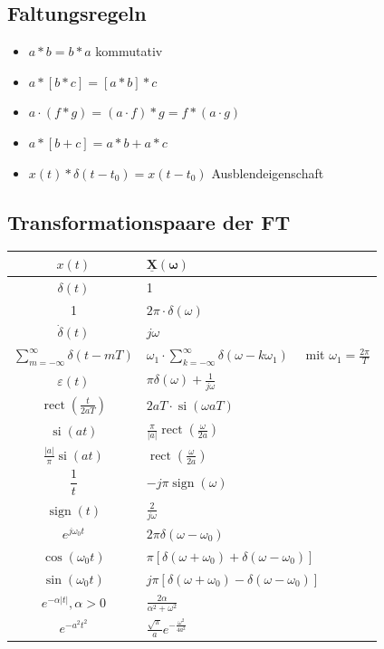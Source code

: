 \subsection{Faltungsregeln}
\normalsize
\begin{itemize}
	\item {$a*b=b*a$} {\small \qquad kommutativ}
	\item $a*[b*c]=[a*b]*c$
	\item $a\cdot(f*g)=(a\cdot f) * g = f * (a\cdot g)$
	\item $a*[b+c]=a*b+a*c$
	\item $x(t) * \delta(t-t_0) = x(t-t_0)$ {\small \qquad Ausblendeigenschaft}
\end{itemize}

\subsection{Transformationspaare der FT}
\begin{tabularx}{0.95\columnwidth}{|c|X|}
	\hline$x(t)$ & $\mathbf{\underline{X}(\omega)}$ \\
	\hline$\delta(t)$ & 1 \\
	\hline 1 & $2 \pi \cdot \delta(\omega)$ \\
	\hline$\dot{\delta}(t)$ & $j \omega$ \\
	\hline$\sum_{m=-\infty}^{\infty} \delta(t-m T)$ & $\omega_{1} \cdot \sum_{k=-\infty}^{\infty} \delta\left(\omega-k \omega_{1}\right) \quad$ mit $\omega_{1}=\frac{2 \pi}{T}$ \\
	\hline$\varepsilon(t)$ & $\pi \delta(\omega)+\frac{1}{j \omega}$ \\
	\hline $\operatorname{rect}\left(\frac{t}{2 a T}\right)$ & $2 aT \cdot \operatorname{si}(\omega aT)$ \\
	\hline $\operatorname{si}(a t)$ & $\frac{\pi}{|a|} \operatorname{rect}\left(\frac{\omega}{2 a}\right)$ \\
	\hline$\frac{|a|}{\pi} \operatorname{si}(a t)$ & $\operatorname{rect}\left(\frac{\omega}{2 a}\right)$ \\
	\hline$\dfrac{1}{t}$ & $-j \pi \operatorname{sign}(\omega)$ \\
	\hline $\operatorname{sign}(t)$ & $\frac{2}{j \omega}$ \\
	\hline$e^{j \omega_{0} t}$ & $2 \pi \delta\left(\omega-\omega_{0}\right)$ \\
	\hline $\cos \left(\omega_{0} t\right)$ & $\pi\left[\delta\left(\omega+\omega_{0}\right)+\delta\left(\omega-\omega_{0}\right)\right]$ \\
	\hline $\sin \left(\omega_{0} t\right)$ & $j \pi\left[\delta\left(\omega+\omega_{0}\right)-\delta\left(\omega-\omega_{0}\right)\right]$ \\
	\hline$e^{-\alpha|t|}, \alpha>0$ & $\frac{2 \alpha}{\alpha^{2}+\omega^{2}}$ \\
	\hline$e^{-a^{2} t^{2}}$ & $\frac{\sqrt{\pi}}{a} e^{-\frac{\omega^{2}}{4 a^{2}}}$ \\
	\hline
\end{tabularx}
